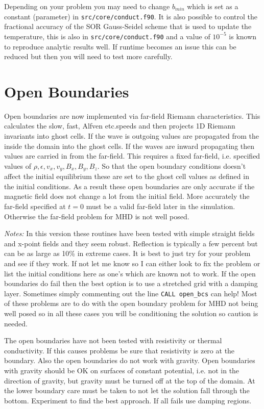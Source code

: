 \documentclass[11pt]{article}
\begin{document}
Depending on your problem you may need to change $b_{min}$ which is set as a constant (parameter) in {\tt src/core/conduct.f90}. It is also possible to control the fractional accuracy of the SOR Gauss-Seidel scheme that is used to update the temperature, this is also in {\tt src/core/conduct.f90} and a value of $10^{-5}$ is known to reproduce analytic results well. If runtime becomes an issue this can be reduced but then you will need to test more carefully.

            
\section{Open  Boundaries} %
\label{sec:open_bcs}
Open boundaries are now implemented via far-field Riemann characteristics. This calculates the slow, fast, Alfven etc.speeds and then projects 1D Riemann invariants into ghost cells. If the wave is outgoing values are propagated from the inside the domain into the ghost cells. If the waves are inward propagating then values are carried in from the far-field. This requires a fixed far-field, i.e. specified values of $\rho, \epsilon, v_x, v_y, B_x, B_y, B_z$. So that the open boundary conditions doesn't affect the initial equilibrium these are set to the ghost cell values as defined in the initial conditions. As a result these open boundaries are only accurate if the magnetic field does not change a lot from the initial field. More accurately the far-field specified at $t=0$ must be a valid far-field later in the simulation. Otherwise the far-field problem for MHD is not well posed.

{\it Notes:} In this version these routines have been tested with simple straight fields and x-point fields and they seem robust. Reflection is typically a few percent but can be as large as 10\% in extreme cases. It is best to just try for your problem and see if they work. If not let me know so I can either look to fix the problem or list the initial conditions here as one's which are known not to work. If the open boundaries do fail then the best option is to use a stretched grid with a damping layer. Sometimes simply commenting out the line {\tt CALL open\_bcs} can help! Most of these problems are to do with the open boundary problem for MHD not being well posed so in all these cases you will be conditioning the solution so caution is needed. 

The open boundaries have not been tested with resistivity or thermal conductivity. If this causes problems be sure that resistivity is zero at the boundary. Also the open boundaries do not work with gravity. Open boundaries with gravity should be OK on surfaces of constant potential, i.e. not in the direction of gravity, but gravity must be turned off at the top of the domain. At the lower boundary care must be taken to not let the solution fall through the bottom. Experiment to find the best approach. If all fails use damping regions.
\end{document}
